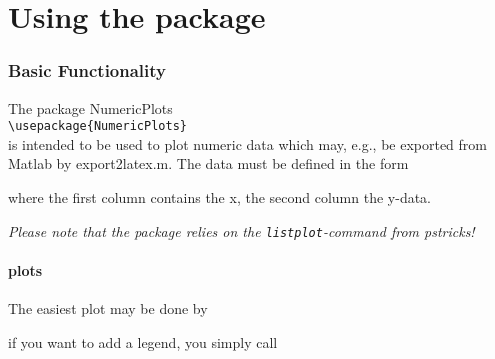 %
%
%
%

\part{Using the package}

\section{Basic Functionality}

The package NumericPlots\\
\verb+\usepackage{NumericPlots}+
\\
is intended to be used to plot numeric data which
may, e.g., be exported from Matlab by export2latex.m. The data must be defined
in the form

where the first column contains the x, the second column the y-data.

\emph{Please note that the package relies on the \texttt{listplot}-command from
pstricks!}

\subsection{plots}


The easiest plot may be done by

\begin{minipage}[T]{0.45\linewidth}
	
\end{minipage}
\hspace{0.05\linewidth}
\begin{minipage}[T]{0.45\linewidth}
	
\end{minipage}

if you want to add a legend, you simply call


